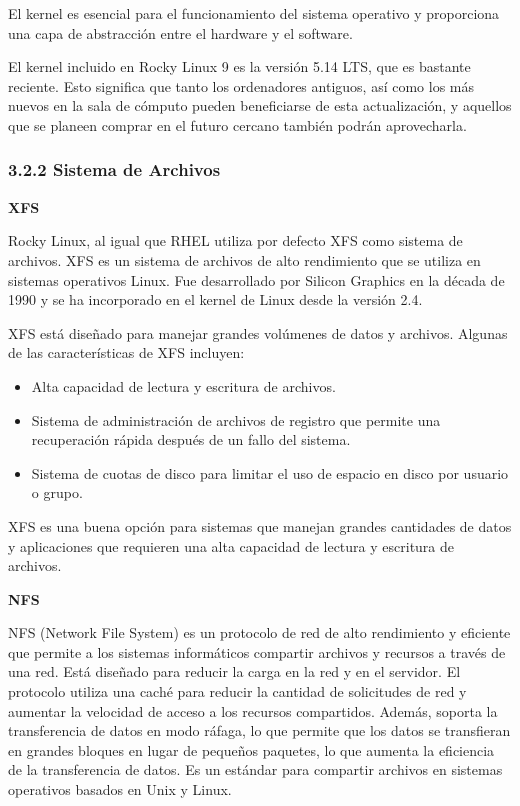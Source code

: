 \begin{spacing}{1.5}
  El kernel es esencial para el funcionamiento del sistema operativo y
  proporciona una capa de abstracción entre el hardware y el software.
  \cite{RHEL-kernel-1}

  El kernel incluido en Rocky Linux 9 es la versión 5.14 LTS, que es bastante
  reciente. Esto significa que tanto los ordenadores antiguos, así como los más
  nuevos en la sala de cómputo pueden beneficiarse de esta actualización, y
  aquellos que se planeen comprar en el futuro cercano también podrán
  aprovecharla. \cite{RL9-release-1}

  \subsubsection{3.2.2 Sistema de Archivos}

  \textbf{XFS}

  Rocky Linux, al igual que RHEL utiliza por defecto XFS como sistema de
  archivos. XFS es un sistema de archivos de alto rendimiento que se utiliza en
  sistemas operativos Linux. Fue desarrollado por Silicon Graphics en la década
  de 1990 y se ha incorporado en el kernel de Linux desde la versión 2.4.

  XFS está diseñado para manejar grandes volúmenes de datos y archivos.
  Algunas de las características de XFS incluyen:

  \begin{itemize}
    \item Alta capacidad de lectura y escritura de archivos.
    \item Sistema de administración de archivos de registro que permite una
          recuperación rápida después de un fallo del sistema.
    \item Sistema de cuotas de disco para limitar el uso de espacio en
          disco por usuario o grupo.
  \end{itemize}

  XFS es una buena opción para sistemas que manejan grandes cantidades de
  datos y aplicaciones que requieren una alta capacidad de lectura y escritura de
  archivos. \cite{RHEL-XFS-1}

  \textbf{NFS}

  NFS (Network File System) es un protocolo de red de alto rendimiento y
  eficiente que permite a los sistemas informáticos compartir archivos y recursos
  a través de una red. Está diseñado para reducir la carga en la red y en el
  servidor. El protocolo utiliza una caché para reducir la cantidad de
  solicitudes de red y aumentar la velocidad de acceso a los recursos
  compartidos. Además, soporta la transferencia de datos en modo ráfaga, lo que
  permite que los datos se transfieran en grandes bloques en lugar de pequeños
  paquetes, lo que aumenta la eficiencia de la transferencia de datos. Es un
  estándar para compartir archivos en sistemas operativos basados en Unix y
  Linux.


\end{spacing}
